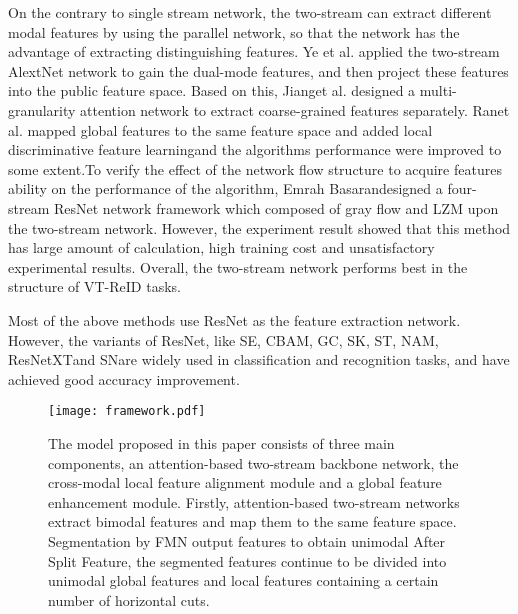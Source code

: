 \documentclass[journal]{IEEEtran}
\begin{document}
	On the contrary to single stream network, the two-stream can extract different modal features by using the parallel network, so that the network has the advantage of extracting distinguishing features. Ye\textsuperscript{\cite{ye2018hierarchical}} et al. applied the two-stream AlextNet network to gain the dual-mode features, and then project these features into the public feature space. Based on this, Jiang\textsuperscript{\cite{jiang2020cross}}et al. designed a multi-granularity attention network to extract coarse-grained features separately. Ran\textsuperscript{\cite{ran2021improving}}et al. mapped global features to the same feature space and added local discriminative feature learningand the algorithms performance were improved to some extent.To verify the effect of the network flow structure to acquire features ability on the performance of the algorithm, Emrah Basaran\textsuperscript{\cite{basaran2020efficient}}designed a four-stream ResNet network framework which composed of gray flow and LZM upon the two-stream network. However, the experiment result showed that this method has large amount of calculation, high training cost and unsatisfactory experimental results. Overall, the two-stream network performs best in the structure of VT-ReID tasks.
	
	Most of the above methods use ResNet as the feature extraction network. However, the variants of ResNet, like SE\textsuperscript{\cite{hu2018squeeze}},  CBAM\textsuperscript{\cite{woo2018cbam}}, GC\textsuperscript{\cite{cao2019gcnet}}, SK\textsuperscript{\cite{li2019selective}}, ST\textsuperscript{\cite{zhang2020resnest}}, NAM\textsuperscript{\cite{liu2021nam}}, ResNetXT\textsuperscript{\cite{xie2017aggregated}}and SN\textsuperscript{\cite{luo2018differentiable}}are widely used in classification and recognition tasks, and have achieved good accuracy improvement.
	
\begin{figure*}[ht]
		\centering
		\texttt{[image: framework.pdf]}
		\caption{The model proposed in this paper consists of three main components, an attention-based two-stream backbone network, the cross-modal local feature alignment module and a global feature enhancement module. Firstly, attention-based two-stream networks extract bimodal features and map them to the same feature space. Segmentation by FMN output features to obtain unimodal After Split Feature, the segmented features continue to be divided into unimodal global features and local features containing a certain number of horizontal cuts.}
		\label{fig framework}
	\end{figure*}
	
\end{document}
